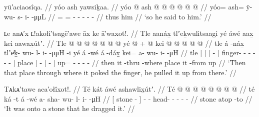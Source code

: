 \ex\label{ex:91-171-so-he-said}%
%
\begingl
	\glpreamble	yū′aciaosîqa. //
	\glpreamble	yóo ash yawsiḵaa. //
	\gla	yóo @ ash @  @ {} @ {} @ {} @ {} @ {} //
	\glb	yóo= ash= ÿ- wu- s- i-  -μμL //
	\glc	{}= = - - - -  - //
	\gld	thus him  {} {} {} {} {} //
	\glft	‘so he said to him.’
		//
\endgl
\xe

\ex\label{ex:91-172-pull-finger-where-poke-thru}%
%
\begingl
	\glpreamble	ʟe anᴀ′x ʟ!akołi′tsag̣ē′awe āx ke ā′waxot!. //
	\glpreamble	Tle aanáx̱ tlʼeḵwulitsaag̱i yé áwé aax̱ kei aawax̱útʼ. //
	\gla	Tle {} {} {}  @ {} {}
			 @ {} @ {} @ {} @ {} @ {} @ {} {} yé {}
		 @ {} +
		{}  @ {} {}
		kei @  @ {} @ {} @ {} @ {} //
	\glb	tle {} {} {} á -náx̱ {}
			tlʼeͥḵ- wu- l- i-  -μμH -i {} yé {}
		á -wé
		{} á -dáx̱ {}
		kei= a- wu- i-  -μH //
	\glc	tle {}[ {}[ {}[  - {}]
			finger- - - -
				 - - {}] place {}]
		 -
		{}[  - {}]
		up= - - -  - //
	\gld	then {} {} {} it -thru {}
			 {} {} {} {} {} -where {} place {}
		 {}
		{} it -from {}
		up  {} {} {} {} //
	\glft	‘Then that place through where it poked the finger, he pulled it up from there.’
		//
\endgl
\xe

\ex\label{ex:91-173-onto-stone-drag}%
%
\begingl
	\glpreamble	Tᴀkᴀ′tawe aca′ołîxot!. //
	\glpreamble	Té kát áwé ashawlix̱útʼ. //
	\gla	{} Té  @ {} {}  @ {}
		 @ {} @ {} @ {} @ {} @ {} @ {} //
	\glb	{} té ká -t {} á -wé
		a- sha- wu- l- i-  -μH //
	\glc	{}[ stone  - {}]  -
		- head- - - -  - //
	\gld	{} stone atop -to {}  {}
		 {} {} {} {} {} {} //
	\glft	‘It was onto a stone that he dragged it.’
		//
\endgl
\xe


